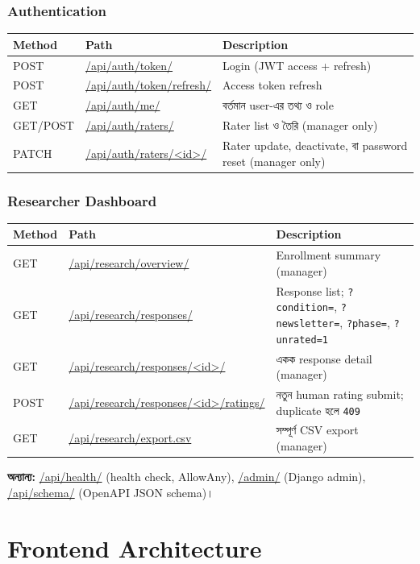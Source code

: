 \documentclass[11pt,a4paper]{article}
\newcommand{\code}[1]{\texttt{\small #1}}
\begin{document}
\subsubsection*{Authentication}
\begin{longtable}{@{}p{1.7cm}p{6.9cm}p{7.4cm}@{}}
\toprule
\textbf{Method} & \textbf{Path} & \textbf{Description} \\
\midrule
\endhead
POST & \url{/api/auth/token/} & Login (JWT access \;+\; refresh) \\
POST & \url{/api/auth/token/refresh/} & Access token refresh \\
GET & \url{/api/auth/me/} & বর্তমান user-এর তথ্য ও role \\
GET/POST & \url{/api/auth/raters/} & Rater list ও তৈরি (manager only) \\
PATCH & \url{/api/auth/raters/<id>/} & Rater update, deactivate, বা password reset (manager only) \\
\bottomrule
\end{longtable}

\subsubsection*{Researcher Dashboard}
\begin{longtable}{@{}p{1.7cm}p{6.9cm}p{7.4cm}@{}}
\toprule
\textbf{Method} & \textbf{Path} & \textbf{Description} \\
\midrule
\endhead
GET & \url{/api/research/overview/} & Enrollment summary (manager) \\
GET & \url{/api/research/responses/} & Response list; \code{?condition=}, \code{?newsletter=},
  \code{?phase=}, \code{?unrated=1} \\
GET & \url{/api/research/responses/<id>/} & একক response detail (manager) \\
POST & \url{/api/research/responses/<id>/ratings/} & নতুন human rating submit; duplicate হলে
  \code{409} \\
GET & \url{/api/research/export.csv} & সম্পূর্ণ CSV export (manager) \\
\bottomrule
\end{longtable}

\textbf{অন্যান্য:} \url{/api/health/} (health check, AllowAny), \url{/admin/} (Django admin),
\url{/api/schema/} (OpenAPI JSON schema)।

\newpage
\section{Frontend Architecture}
\end{document}
